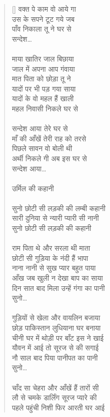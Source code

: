 \begin{verse}[\versewidth]
{वक्त पे काम वो आये गा\\
उस के सपने टूट गये जब\\
पाँव निकाला तू ने घर से\\
सन्देश…\\
\\
माया खातिर जाल बिछाया\\
जाल में अपना आप गंवाया\\
मात पिता को छोड़ा तू ने\\
यादों पर भी पड़ गया साया\\
यादों के वो महल हैं खाली\\
महल निवासी निकले घर से\\
\\
सन्देश आया तेरे घर से\\
माँ की आँखें तेरी राह को तरसे\\
पिछले सावन वो बोली थी\\
अर्थी निकले गी अब इस घर से\\
सन्देश आया…\\
\\
उर्मिल की कहानी\\
\\
सुनो छोटी सी लड़की की लम्बी कहानी\\
सारी दुनिया से न्यारी प्यारी सी नानी\\
सुनो छोटी सी लड़की की कहानी\\
\\
राम पिता थे और सरला थी माता\\
छोटी सी गुड़िया के नंदी हैं भापा\\
नाना नानी से सुख प्यार बहुत पाया\\
आँख जब खुली न देखा बाप का साया\\
दिन सात बाद मिला उन्हें गंगा का पानी\\
सुनो…\\
\\
गुड़ियों से खेला और वायलिन बजाया\\
छोड़ पाकिस्तान लुधियाना घर बनाया\\
चीनी घर में थोड़ी पर बाँट इस ने खाई\\
यौवन में आई तो सूरज से की सगाई\\
नौ साल बाद पिया पानीपत का पानी\\
सुनो…\\
\\
चाँद सा चेहरा और आँखें हैं तारों सी\\
लौ से चमके डार्लिंग सूरज प्यारे की\\
पहले पहुंची निशी फिर आरती घर आई\\
}
\end{verse}
